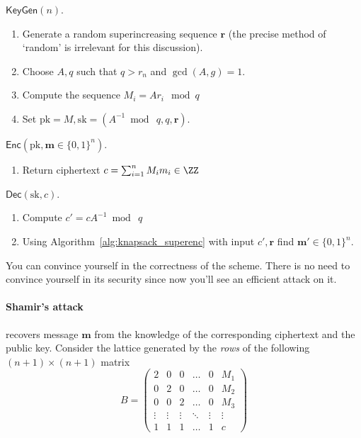 \documentclass[11pt]{exam}
\theoremstyle{definition}
\let\vec\mathbf
\begin{document}
{\medskip

$\mathsf{KeyGen}(n)$.
\begin{enumerate}
	\item Generate a random superincreasing sequence $\vec r$ (the precise method of `random' is irrelevant for this discussion).
	\item Choose $A, q$ such that $q>r_n$ and $\gcd(A,g) = 1$.
	\item Compute the sequence $M_i = Ar_i~\bmod q$
	\item Set $\mathrm{pk} = M, \mathrm{sk} = (A^{-1}\bmod~q, q, \vec r)$.
\end{enumerate}

\medskip

$\mathsf{Enc}(\mathrm{pk}, \vec m \in \{ 0,1\}^n)$.
\begin{enumerate}
	\item Return ciphertext $c = \sum_{i=1}^n M_i m_i \in \ZZ$
\end{enumerate}

\medskip
$\mathsf{Dec}(\mathrm{sk}, c)$.
\begin{enumerate}
	\item Compute $c' = c A^{-1}\bmod~q$
	\item Using Algorithm~\ref{alg:knapsack_superenc} with input $c', \vec r$ find $\vec m' \in \{0,1\}^n$.
\end{enumerate}

You can convince yourself in the correctness of the scheme. There is no need to convince yourself in its security since now you'll see an efficient attack on it.

\medskip

\paragraph{Shamir's attack} recovers message $\vec m$ from the knowledge of the corresponding ciphertext and the public key. Consider the lattice generated by the \emph{rows} of the following $(n+1) \times (n+1)$ matrix
\[
	B = 
	\begin{pmatrix}
		2 & 0 & 0 & \ldots & 0 & M_1 \\
		0 & 2 & 0 & \ldots & 0 & M_2 \\
		0 & 0 & 2 & \ldots & 0 & M_3 \\
		\vdots & \vdots & \vdots & \ddots & \vdots & \vdots \\
		1 & 1 & 1 & \ldots & 1 & c 
	\end{pmatrix}
\]

}
\end{document}
